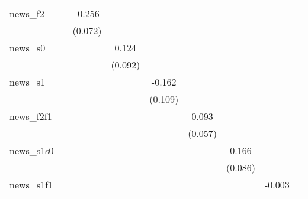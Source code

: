 {\begin{tabular}{l*{8}{c}}
news\_f2     &                     &      -0.256\sym{***}&                     &                     &                     &                     &                     &                     \\
            &                     &     (0.072)         &                     &                     &                     &                     &                     &                     \\
\addlinespace
news\_s0     &                     &                     &       0.124         &                     &                     &                     &                     &                     \\
            &                     &                     &     (0.092)         &                     &                     &                     &                     &                     \\
\addlinespace
news\_s1     &                     &                     &                     &      -0.162         &                     &                     &                     &                     \\
            &                     &                     &                     &     (0.109)         &                     &                     &                     &                     \\
\addlinespace
news\_f2f1   &                     &                     &                     &                     &       0.093         &                     &                     &                     \\
            &                     &                     &                     &                     &     (0.057)         &                     &                     &                     \\
\addlinespace
news\_s1s0   &                     &                     &                     &                     &                     &       0.166\sym{*}  &                     &                     \\
            &                     &                     &                     &                     &                     &     (0.086)         &                     &                     \\
\addlinespace
news\_s1f1   &                     &                     &                     &                     &                     &                     &      -0.003         &                     \\

\end{tabular}}
